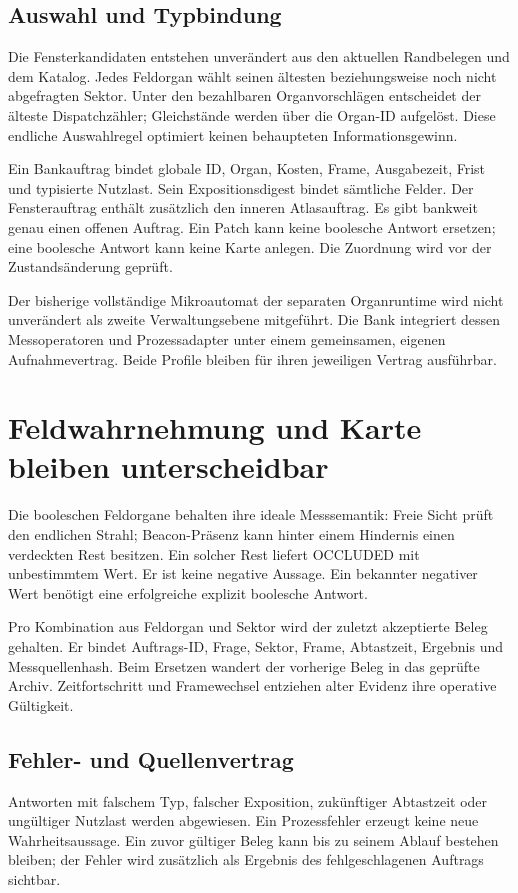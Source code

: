 \documentclass[11pt,a4paper]{article}
\newcommand{\nextsection}[2]{\clearpage{\color{accent}\small\textsf{#1}}\section{#2}}
\begin{document}
\subsection{Auswahl und Typbindung}
Die Fensterkandidaten entstehen unverändert aus den aktuellen
Randbelegen und dem Katalog. Jedes Feldorgan wählt seinen ältesten
beziehungsweise noch nicht abgefragten Sektor. Unter den bezahlbaren
Organvorschlägen entscheidet der älteste Dispatchzähler; Gleichstände
werden über die Organ-ID aufgelöst. Diese endliche Auswahlregel
optimiert keinen behaupteten Informationsgewinn.

Ein Bankauftrag bindet globale ID, Organ, Kosten, Frame, Ausgabezeit,
Frist und typisierte Nutzlast. Sein Expositionsdigest bindet sämtliche
Felder. Der Fensterauftrag enthält zusätzlich den inneren Atlasauftrag.
Es gibt bankweit genau einen offenen Auftrag. Ein Patch kann keine
boolesche Antwort ersetzen; eine boolesche Antwort kann keine Karte
anlegen. Die Zuordnung wird vor der Zustandsänderung geprüft.

Der bisherige vollständige Mikroautomat der separaten Organruntime
wird nicht unverändert als zweite Verwaltungsebene mitgeführt.
Die Bank integriert dessen Messoperatoren und Prozessadapter unter
einem gemeinsamen, eigenen Aufnahmevertrag. Beide Profile bleiben
für ihren jeweiligen Vertrag ausführbar.

\nextsection{39 / TYPISIERTE EVIDENZ}{Feldwahrnehmung und Karte bleiben unterscheidbar}
Die booleschen Feldorgane behalten ihre ideale Messsemantik:
Freie Sicht prüft den endlichen Strahl; Beacon-Präsenz kann hinter
einem Hindernis einen verdeckten Rest besitzen. Ein solcher Rest
liefert OCCLUDED mit unbestimmtem Wert. Er ist keine negative
Aussage. Ein bekannter negativer Wert benötigt eine erfolgreiche
explizit boolesche Antwort.

Pro Kombination aus Feldorgan und Sektor wird der zuletzt akzeptierte
Beleg gehalten. Er bindet Auftrags-ID, Frage, Sektor, Frame,
Abtastzeit, Ergebnis und Messquellenhash. Beim Ersetzen wandert der
vorherige Beleg in das geprüfte Archiv. Zeitfortschritt und Framewechsel
entziehen alter Evidenz ihre operative Gültigkeit.

\subsection{Fehler- und Quellenvertrag}
Antworten mit falschem Typ, falscher Exposition, zukünftiger Abtastzeit
oder ungültiger Nutzlast werden abgewiesen. Ein Prozessfehler erzeugt
keine neue Wahrheitsaussage. Ein zuvor gültiger Beleg kann bis zu seinem
Ablauf bestehen bleiben; der Fehler wird zusätzlich als Ergebnis des
fehlgeschlagenen Auftrags sichtbar.
\end{document}
